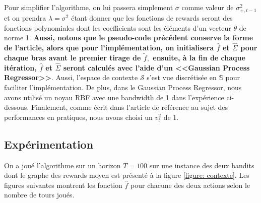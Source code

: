 \documentclass[letterpaper,11pt]{article}
\begin{document}
Pour simplifier l'algorithme, on lui passera simplement $\sigma$ comme valeur de $\sigma^2_{+,t-1}$ et on prendra $\lambda=\sigma^2$ étant donner que les fonctions de rewards seront des fonctions polynomiales dont les coefficients sont les éléments d'un vecteur $\theta$ de norme 1. \textbf{Aussi, notons que le pseudo-code précédent conserve la forme de l'article, alors que pour l'implémentation, on initialisera $\widehat{f}$ et $\widehat{\Sigma}$ pour chaque bras avant le premier tirage de $\tilde{f},$ ensuite, à la fin de chaque itération, $\widehat{f}$ et $\widehat{\Sigma}$ seront calculés avec l'aide d'un <<Gaussian Process Regressor>>}. Aussi, l'espace de contexte $\mathcal{S}$ s'est vue discrétisée en $\mathbb{S}$ pour faciliter l'implémentation. De plus, dans le Gaussian Process Regressor, nous avons utilisé un noyau RBF avec une bandwidth de 1 dans l'expérience ci-dessous. Finalement, comme écrit dans l'article de référence au sujet des performances en pratiques, nous avons choisi un $v_t^2$ de 1.

\subsection{Expérimentation}

On a joué l'algorithme sur un horizon $T=100$ sur une instance des deux bandits dont le graphe des rewards moyen est présenté à la figure \ref{figure: contexte}. Les figures suivantes montrent les fonction $\widehat{f}$ pour chacune des deux actions selon le nombre de tours joués.
\end{document}
